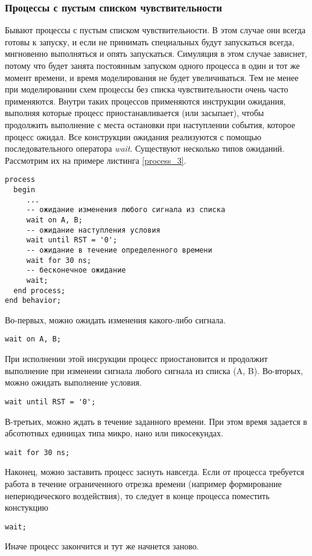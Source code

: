 \subsubsection{Процессы с пустым списком чувствительности}

Бывают процессы с пустым списком чувствительности. В этом случае они всегда готовы к запуску, и если не принимать специальных будут запускаться всегда, мнгновенно выполняться и опять запускаться. Симуляция в этом случае зависнет, потому что будет занята постоянным запуском одного процесса в один и тот же момент времени, и время моделирования не будет увеличиваться. Тем не менее при моделировании схем процессы без списка чувствительности очень часто применяются. Внутри таких процессов применяются инструкции ожидания, выполняя которые процесс приостанавливается (или засыпает), чтобы продолжить выполнение с места остановки при наступлении события, которое процесс ожидал.
Все конструкции ожидания реализуются с помощью последовательного оператора \emph{wait}. Существуют несколько типов ожиданий. Рассмотрим их на примере листинга \ref{process_3}.

\begin{Code}
\begin{lstlisting}[caption=Процесс с пустым списком чувствительности и оператором \emph{wait}, label=process_3]
  process
  begin
     ...
     -- ожидание изменения любого сигнала из списка
     wait on A, B;
     -- ожидание наступления условия
     wait until RST = '0';
     -- ожидание в течение определенного времени
     wait for 30 ns;
     -- бесконечное ожидание
     wait;
  end process;
end behavior;
\end{lstlisting}
\end{Code}

Во-первых, можно ожидать изменения какого-либо сигнала.
\begin{lstlisting}
wait on A, B;
\end{lstlisting}
При исполнении этой инсрукции процесс приостановится и продолжит выполнение при изменеии сигнала любого сигнала из списка (A, B). Во-вторых, можно ожидать выполнение условия.
\begin{lstlisting}
wait until RST = '0';
\end{lstlisting}
В-третьих, можно ждать в течение заданного времени. При этом время задается в абсотютных единицах типа микро, нано или пикосекундах.
\begin{lstlisting}
wait for 30 ns;
\end{lstlisting}
Наконец, можно заставить процесс заснуть навсегда. Если от процесса требуется работа в течение ограниченного отрезка времени (например формирование непериодического воздействия), то следует в конце процесса поместить констукцию
\begin{lstlisting}
wait;
\end{lstlisting}
Иначе процесс закончится и тут же начнется заново.

